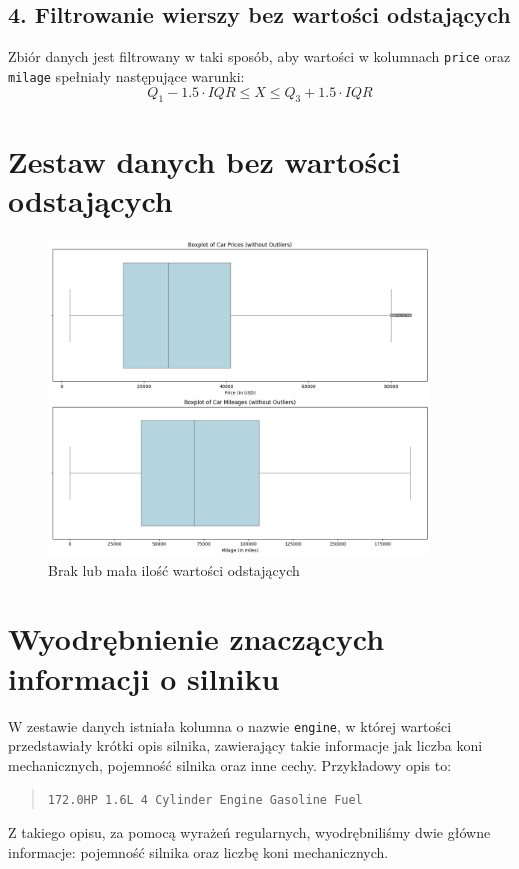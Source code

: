\documentclass[12pt, a4paper]{report}
\begin{document}
\subsection*{4. Filtrowanie wierszy bez wartości odstających}
Zbiór danych jest filtrowany w taki sposób, aby wartości w kolumnach \texttt{price} oraz \texttt{milage} spełniały następujące warunki:
\[
Q_1 - 1.5 \cdot IQR \leq X \leq Q_3 + 1.5 \cdot IQR
\]

\section{Zestaw danych bez wartości odstających}
\begin{figure}[H]
    \centering
    \includegraphics[width=0.9\textwidth]{images/boxplots_without_outlires.png}
    \caption{Brak lub mała ilość wartości odstających}
\end{figure}
\section{Wyodrębnienie znaczących informacji o silniku}

W zestawie danych istniała kolumna o nazwie \texttt{engine}, w której wartości przedstawiały krótki opis silnika, zawierający takie informacje jak liczba koni mechanicznych, pojemność silnika oraz inne cechy. Przykładowy opis to:

\begin{quote}
\texttt{172.0HP 1.6L 4 Cylinder Engine Gasoline Fuel}
\end{quote}

Z takiego opisu, za pomocą wyrażeń regularnych, wyodrębniliśmy dwie główne informacje: pojemność silnika oraz liczbę koni mechanicznych. 
\end{document}

